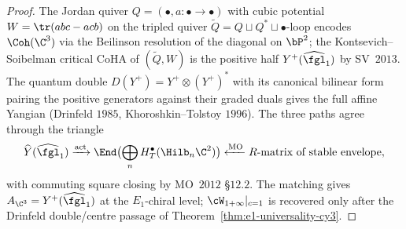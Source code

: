 \begin{proof}
The Jordan quiver $Q = (\bullet, a\colon\bullet\to\bullet)$ with cubic
potential $W = \tr(abc - acb)$ on the tripled quiver
$\widetilde Q = Q \sqcup Q^* \sqcup \bullet$-loop encodes
$\Coh(\C^3)$ via the Beilinson resolution of the diagonal on $\bP^2$;
the Kontsevich--Soibelman critical CoHA of $(\widetilde Q, W)$ is the
positive half $Y^+(\widehat{\fgl}_1)$ by SV~$2013$. The quantum double
$D(Y^+) = Y^+ \otimes (Y^+)^*$ with its canonical bilinear form pairing
the positive generators against their graded duals gives the full
affine Yangian (Drinfeld $1985$, Khoroshkin--Tolstoy $1996$). The three
paths agree through the triangle
\[
 \widehat{Y}(\widehat{\fgl}_1)
 \xrightarrow{\mathrm{act}}
 \End\bigl(\bigoplus_n H^\bullet_T(\Hilb_n\C^2)\bigr)
 \xleftarrow{\mathrm{MO}}
 R\text{-matrix of stable envelope},
\]
with commuting square closing by MO~$2012$ \S$12.2$.
The matching gives $A_{\C^3}=Y^+(\widehat{\fgl}_1)$ at the $E_1$-chiral level; $\cW_{1+\infty}|_{c=1}$ is recovered only after the Drinfeld double/centre passage of Theorem~\ref{thm:e1-universality-cy3}.
\end{proof}

